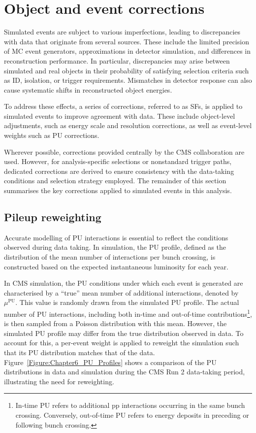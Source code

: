 \section{Object and event corrections}

Simulated events are subject to various imperfections, leading to discrepancies with data that originate from several sources. These include the limited precision of \ac{MC} event generators, approximations in detector simulation, and differences in reconstruction performance. In particular, discrepancies may arise between simulated and real objects in their probability of satisfying selection criteria such as ID, isolation, or trigger requirements. Mismatches in detector response can also cause systematic shifts in reconstructed object energies.

To address these effects, a series of corrections, referred to as \acp{SF}, is applied to simulated events to improve agreement with data. These include object-level adjustments, such as energy scale and resolution corrections, as well as event-level weights such as \ac{PU} corrections.

Wherever possible, corrections provided centrally by the \ac{CMS} collaboration are used. However, for analysis-specific selections or nonstandard trigger paths, dedicated corrections are derived to ensure consistency with the data-taking conditions and selection strategy employed. The remainder of this section summarises the key corrections applied to simulated events in this analysis.

\subsection{Pileup reweighting}

Accurate modelling of \ac{PU} interactions is essential to reflect the conditions observed during data taking. In simulation, the \ac{PU} profile, defined as the distribution of the mean number of interactions per bunch crossing, is constructed based on the expected instantaneous luminosity for each year. 

In \ac{CMS} simulation, the \ac{PU} conditions under which each event is generated are characterised by a ``true'' mean number of additional interactions, denoted by $\mu^{\text{PU}}$. This value is randomly drawn from the simulated \ac{PU} profile. The actual number of \ac{PU} interactions, including both in-time and out-of-time contributions\footnote{In-time \ac{PU} refers to additional pp interactions occurring in the same bunch crossing. Conversely, out-of-time \ac{PU} refers to energy deposits in preceding or following bunch crossing.}, is then sampled from a Poisson distribution with this mean. However, the simulated \ac{PU} profile may differ from the true distribution observed in data. To account for this, a per-event weight is applied to reweight the simulation such that its \ac{PU} distribution matches that of the data. Figure~\ref{Figure:Chapter6_PU_Profiles} shows a comparison of the \ac{PU} distributions in data and simulation during the \ac{CMS} Run 2 data-taking period, illustrating the need for reweighting.

